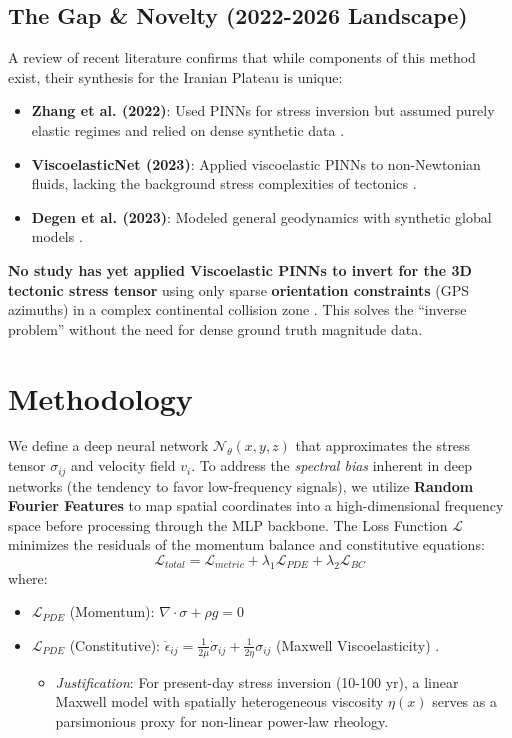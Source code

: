 \documentclass[11pt, a4paper]{article}
\begin{document}
\subsection*{The Gap \& Novelty (2022-2026 Landscape)}
A review of recent literature confirms that while components of this method exist, their synthesis for the Iranian Plateau is unique:
\begin{itemize}
    \item \textbf{Zhang et al. (2022)}: Used PINNs for stress inversion but assumed purely elastic regimes and relied on dense synthetic data \cite{Zhang2022}.
    \item \textbf{ViscoelasticNet (2023)}: Applied viscoelastic PINNs to non-Newtonian fluids, lacking the background stress complexities of tectonics \cite{Li2023}.
    \item \textbf{Degen et al. (2023)}: Modeled general geodynamics with synthetic global models \cite{Degen2023}.
\end{itemize}
\textbf{No study has yet applied Viscoelastic PINNs to invert for the 3D tectonic stress tensor} using only sparse \textbf{orientation constraints} (GPS azimuths) in a complex continental collision zone \cite{Zamani2017}. This solves the ``inverse problem'' without the need for dense ground truth magnitude data.

\section{Methodology}

We define a deep neural network $\mathcal{N}_\theta(x,y,z)$ that approximates the stress tensor $\sigma_{ij}$ and velocity field $v_i$. To address the \textit{spectral bias} inherent in deep networks (the tendency to favor low-frequency signals), we utilize \textbf{Random Fourier Features} to map spatial coordinates into a high-dimensional frequency space before processing through the MLP backbone. The Loss Function $\mathcal{L}$ minimizes the residuals of the momentum balance and constitutive equations:
\begin{equation}
    \mathcal{L}_{total} = \mathcal{L}_{metric} + \lambda_1 \mathcal{L}_{PDE} + \lambda_2 \mathcal{L}_{BC}
\end{equation}
where:
\begin{itemize}
    \item $\mathcal{L}_{PDE}$ (Momentum): $\nabla \cdot \sigma + \rho g = 0$
    \item $\mathcal{L}_{PDE}$ (Constitutive): $\dot{\epsilon}_{ij} = \frac{1}{2\mu}\dot{\sigma}_{ij} + \frac{1}{2\eta}\sigma_{ij}$ (Maxwell Viscoelasticity) \cite{Ranalli1995}.
    \begin{itemize}
        \item \textit{Justification}: For present-day stress inversion (10-100 yr), a linear Maxwell model with spatially heterogeneous viscosity $\eta(x)$ serves as a parsimonious proxy for non-linear power-law rheology.
    \end{itemize}
\end{itemize}
\end{document}
